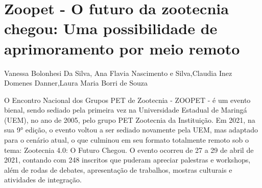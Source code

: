 

\section{Zoopet - O futuro da zootecnia chegou: Uma possibilidade de aprimoramento por meio  remoto}

Vanessa Bolonhesi Da Silva, Ana Flavia Nascimento e Silva,Claudia Inez  Domenes Danner,Laura Maria Borri de Souza

O Encontro Nacional dos Grupos PET de Zootecnia - ZOOPET - é um evento bienal, sendo sediado pela primeira vez na Universidade Estadual de Maringá (UEM), no ano de 2005, pelo grupo PET Zootecnia da Instituição. Em 2021, na sua 9° edição, o evento voltou a ser sediado novamente pela UEM, mas adaptado para o cenário atual, o que culminou em seu formato totalmente remoto sob o tema: Zootecnia 4.0: O Futuro Chegou. O evento ocorreu de 27 a 29 de abril de 2021, contando com 248 inscritos que puderam apreciar palestras e workshops, além de rodas de debates, apresentação de trabalhos, mostras culturais e atividades de integração.




